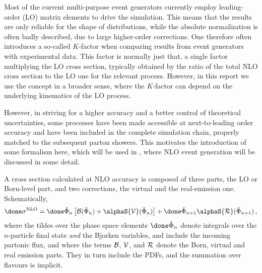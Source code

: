 \label{sec:subprocesses:NLOcross_sections}
Most of the current multi-purpose event generators currently employ
leading-order (LO) matrix elements to drive the simulation. This means
that the results are only reliable for the shape of distributions,
while the absolute normalization is often badly described, due to
large higher-order corrections. One therefore often introduces a
so-called $K$-factor when comparing results from event generators with
experimental data. This factor is normally just that, a single factor
multiplying the LO cross section, typically obtained by the ratio of
the total NLO cross section to the LO one for the relevant
process. However, in this report we use the concept in a broader
sense, where the $K$-factor can depend on the underlying kinematics of
the LO process.

However, in striving for a higher accuracy and a better control
of theoretical uncertainties, some processes have been made accessible
at next-to-leading order accuracy and have been included in the
complete simulation chain, properly matched to the subsequent parton
showers.  This motivates the introduction of some formalism here,
which will be used in , where NLO event
generation will be discussed in some detail.

A cross section calculated at NLO accuracy is composed of three parts,
the LO or Born-level part, and two corrections, the virtual and the 
real-emission one.  Schematically,
\begin{equation}
\done\sigma^{\rm NLO} =
\done\tilde\Phi_n\left[{\cal B}(\tilde\Phi_n) + \alphaS{\cal V}(\tilde\Phi_n)\right] +
\done\tilde\Phi_{n+1}\alphaS{\cal R}(\tilde\Phi_{n+1})\,,
\end{equation}
where the tildes over the phase space elements $\done\tilde\Phi_{n}$ denote integrals over
the $n$-particle final state {\em and} the Bjorken variables, and
include the incoming partonic flux, and where the terms ${\cal B}$,
${\cal V}$, and ${\cal R}$ denote the Born, virtual and real emission
parts.  They in turn include the PDFs, and the summation over flavours
is implicit.

